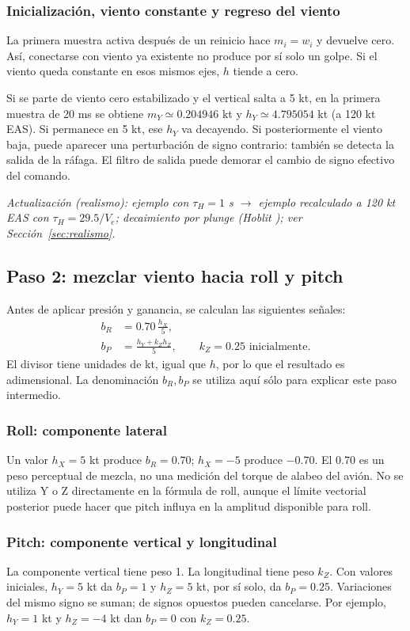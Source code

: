 \subsubsection{Inicialización, viento constante y regreso del viento}
La primera muestra activa después de un reinicio hace $m_i=w_i$ y devuelve cero. Así, conectarse con viento ya existente no produce por sí solo un golpe. Si el viento queda constante en esos mismos ejes, $h$ tiende a cero.

Si se parte de viento cero estabilizado y el vertical salta a 5 kt, en la primera muestra de 20 ms se obtiene $m_Y\simeq0.204946$ kt y $h_Y\simeq4.795054$ kt (a 120 kt EAS). Si permanece en 5 kt, ese $h_Y$ va decayendo. Si posteriormente el viento baja, puede aparecer una perturbación de signo contrario: también se detecta la salida de la ráfaga. El filtro de salida puede demorar el cambio de signo efectivo del comando.

\textit{Actualización (realismo): ejemplo con $\tau_H=1$ s $\rightarrow$ ejemplo recalculado a 120 kt EAS con $\tau_H=29.5/V_e$; decaimiento por plunge (Hoblit \cite{hoblit1988}); ver Sección~\ref{sec:realismo}.}

\subsection{Paso 2: mezclar viento hacia roll y pitch}
Antes de aplicar presión y ganancia, se calculan las siguientes señales:
\begin{align}
b_R&=0.70\,\frac{h_X}{5},\\
b_P&=\frac{h_Y+k_Zh_Z}{5},\qquad k_Z=0.25\text{ inicialmente}.
\label{eq:turb-mix}
\end{align}
El divisor tiene unidades de kt, igual que $h$, por lo que el resultado es adimensional. La denominación $b_R,b_P$ se utiliza aquí sólo para explicar este paso intermedio.

\subsubsection{Roll: componente lateral}
Un valor $h_X=5$ kt produce $b_R=0.70$; $h_X=-5$ produce $-0.70$. El 0.70 es un peso perceptual de mezcla, no una medición del torque de alabeo del avión. No se utiliza Y o Z directamente en la fórmula de roll, aunque el límite vectorial posterior puede hacer que pitch influya en la amplitud disponible para roll.

\subsubsection{Pitch: componente vertical y longitudinal}
La componente vertical tiene peso 1. La longitudinal tiene peso $k_Z$. Con valores iniciales, $h_Y=5$ kt da $b_P=1$ y $h_Z=5$ kt, por sí solo, da $b_P=0.25$. Variaciones del mismo signo se suman; de signos opuestos pueden cancelarse. Por ejemplo, $h_Y=1$ kt y $h_Z=-4$ kt dan $b_P=0$ con $k_Z=0.25$.

